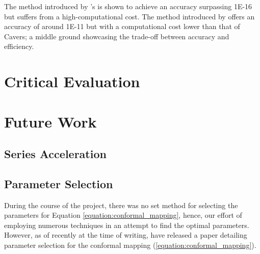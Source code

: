 \documentclass[a4paper]{report}
\begin{document}
The method introduced by \citet{Cavers1978FFT}'s is shown to achieve an accuracy surpassing 1E-16 but suffers from a high-computational cost. The method introduced by \citet{AbateWhitt1992a, AbateWhitt1992b} offers an accuracy of around 1E-11 but with a computational cost lower than that of Cavers; a middle ground showcasing the trade-off between accuracy and efficiency.	

\section{Critical Evaluation}

\section{Future Work}

\subsection{Series Acceleration}

\subsection{Parameter Selection}
During the course of the project, there was no set method for selecting the parameters for Equation \ref{equation:conformal_mapping}, hence, our effort of employing numerous techniques in an attempt to find the optimal parameters. However, as of recently at the time of writing, \citet{boyarchenko2024efficient} have released a paper detailing parameter selection for the conformal mapping (\autoref{equation:conformal_mapping}).





\end{document}
